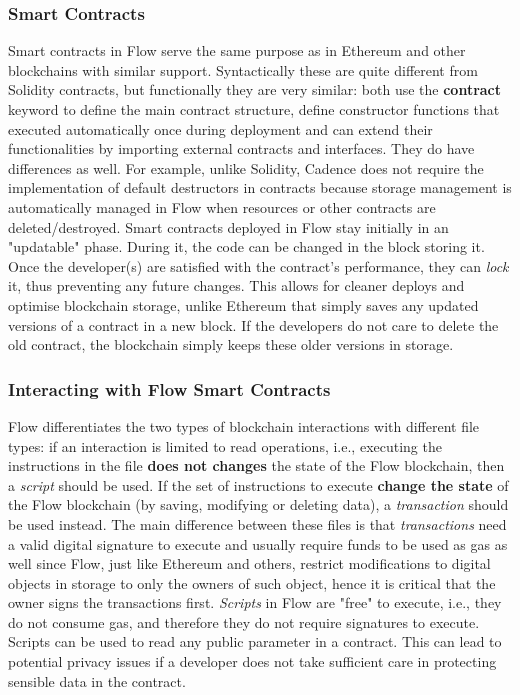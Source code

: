 \documentclass[../NFTComp_IEEE.tex]{subfiles}
\begin{document}
\subsubsection{Smart Contracts}
\label{sec:smart_contracts}
Smart contracts in Flow serve the same purpose as in Ethereum and other blockchains with similar support. Syntactically these are quite different from Solidity contracts, but functionally they are very similar: both use the \textbf{contract} keyword to define the main contract structure, define constructor functions that executed automatically once during deployment and can extend their functionalities by importing external contracts and interfaces. They do have differences as well. For example, unlike Solidity, Cadence does not require the implementation of default destructors in contracts because storage management is automatically managed in Flow when resources or other contracts are deleted/destroyed. Smart contracts deployed in Flow stay initially in an "updatable" phase. During it, the code can be changed in the block storing it. Once the developer(s) are satisfied with the contract's performance, they can \textit{lock} it, thus preventing any future changes. This allows for cleaner deploys and optimise blockchain storage, unlike Ethereum that simply saves any updated versions of a contract in a new block. If the developers do not care to delete the old contract, the blockchain simply keeps these older versions in storage.

\subsubsection{Interacting with Flow Smart Contracts}
Flow differentiates the two types of blockchain interactions with different file types: if an interaction is limited to read operations, i.e., executing the instructions in the file \textbf{does not changes} the state of the Flow blockchain, then a \textit{script} should be used. If the set of instructions to execute \textbf{change the state} of the Flow blockchain (by saving, modifying or deleting data), a \textit{transaction} should be used instead. The main difference between these files is that \textit{transactions} need a valid digital signature to execute and usually require funds to be used as gas as well since Flow, just like Ethereum and others, restrict modifications to digital objects in storage to only the owners of such object, hence it is critical that the owner signs the transactions first. \textit{Scripts} in Flow are "free" to execute, i.e., they do not consume gas, and therefore they do not require signatures to execute. Scripts can be used to read any public parameter in a contract. This can lead to potential privacy issues if a developer does not take sufficient care in protecting sensible data in the contract.
\end{document}
